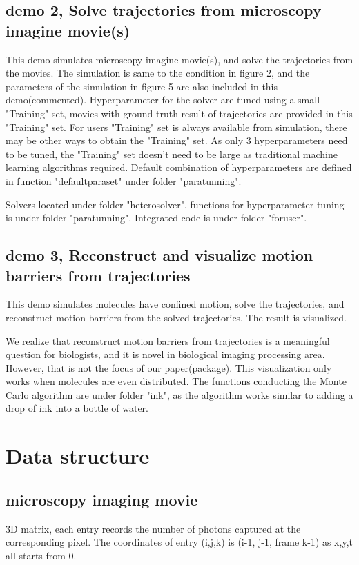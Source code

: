 \documentclass[a4paper]{article}
\begin{document}
\begin{CJK*}{UTF8}{kai}
\subsection{demo 2, Solve trajectories from microscopy imagine movie(s)}
This demo simulates microscopy imagine movie(s), and solve the trajectories from the movies. The simulation is same to the condition in figure 2, and the parameters of the simulation in figure 5 are also included in this demo(commented). Hyperparameter for the solver are tuned using a small "Training" set, movies with ground truth result of trajectories are provided in this "Training" set. For users "Training" set is always available from simulation, there may be other ways to obtain the "Training" set. As only 3 hyperparameters need to be tuned, the "Training" set doesn't need to be large as traditional machine learning algorithms required. Default combination of hyperparameters are defined in function "defaultparaset" under folder "paratunning".

Solvers located under folder "heterosolver", functions for hyperparameter tuning is under folder "paratunning". Integrated code is under folder "foruser".

\subsection{demo 3, Reconstruct and visualize motion barriers from trajectories}
This demo simulates molecules have confined motion, solve the trajectories, and reconstruct motion barriers from the solved trajectories. The result is visualized.

We realize that reconstruct motion barriers from trajectories is a meaningful question for biologists, and it is novel in biological imaging processing area. However, that is not the focus of our paper(package). This visualization only works when molecules are even distributed. The functions conducting the Monte Carlo algorithm are under folder "ink", as the algorithm works similar to adding a drop of ink into a bottle of water.

\section{Data structure}
\subsection{microscopy imaging movie}
3D matrix, each entry records the number of photons captured at the corresponding pixel. The coordinates of entry (i,j,k) is (i-1, j-1, frame k-1) as x,y,t all starts from 0.

\end{CJK*}
\end{document}
